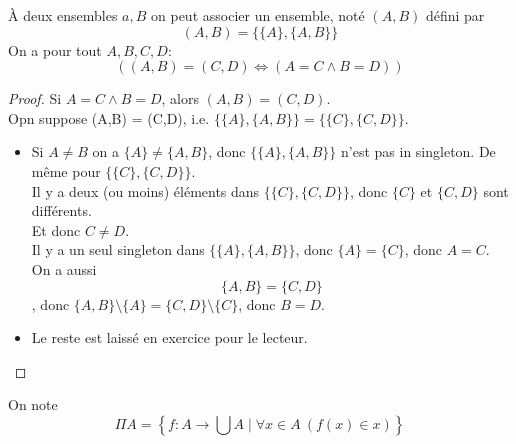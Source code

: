 \begin{prop}
	À deux ensembles $a, B$ on peut associer un ensemble, noté $(A,B)$ défini par
	$$ (A,B) = \{ \{A\}, \{A,B\} \}$$
	On a pour tout $A, B, C, D$:
	$$ \left((A, B) = (C,D) \iff (A = C \land B = D)\right)$$
\end{prop}

\begin{proof}
	Si $A = C \land B = D$, alors $(A,B) = (C,D)$.\\
	Opn suppose (A,B) = (C,D), i.e. $\{\{A\}, \{A,B\}\} = \{\{C\}, \{C,D\}\}$.\\

	\begin{itemize}
		\item Si $A \neq B$ on a $\{A\} \neq \{A,B\}$, donc $\{\{A\}, \{A,B\}\}$ n'est pas in singleton.
		      De même pour $\{\{C\}, \{C,D\}\}$.\\
		      Il y a deux (ou moins) éléments dans $\{\{C\}, \{C,D\}\}$, donc $\{C\}$ et  $\{C,D\}$ sont différents.\\
		      Et donc $C \neq D$. \\
		      Il y a un seul singleton dans $\{\{A\}, \{A,B\}\}$, donc $\{A\} = \{C\}$, donc $A = C$.\\
		      On a aussi $$\{A,B\} = \{C,D\}$$, donc $\{A, B\}\setminus \{A\} = \{C,D\}\setminus \{C\}$, donc $B = D$.
		\item Le reste est laissé en exercice pour le lecteur.
	\end{itemize}
\end{proof}


On note
$$ \Pi A = \left\{ f: A \to \bigcup A \mid \forall x \in A \ (f(x) \in x) \right\}$$



